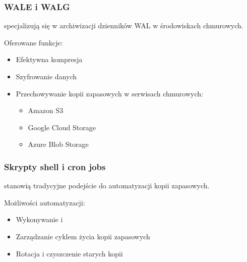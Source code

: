 \documentclass[a4paper,11pt,openany,english]{sphinxmanual}
\begin{document}
\subsubsection{WAL\sphinxhyphen{}E i WAL\sphinxhyphen{}G}
\label{\detokenize{rozdzial2/Kopie_zapasowe_i_odzyskiwanie_danych/kopie_zapasowe_i_odzyskiwanie_danych:wal-e-i-wal-g}}
\sphinxAtStartPar
{} specjalizują się w archiwizacji dzienników WAL w środowiskach chmurowych.

\sphinxAtStartPar
Oferowane funkcje:
\begin{itemize}
\item {} 
\sphinxAtStartPar
Efektywna kompresja

\item {} 
\sphinxAtStartPar
Szyfrowanie danych

\item {} 
\sphinxAtStartPar
Przechowywanie kopii zapasowych w serwisach chmurowych:
\begin{itemize}
\item {} 
\sphinxAtStartPar
Amazon S3

\item {} 
\sphinxAtStartPar
Google Cloud Storage

\item {} 
\sphinxAtStartPar
Azure Blob Storage

\end{itemize}

\end{itemize}


\subsubsection{Skrypty shell i cron jobs}
\label{\detokenize{rozdzial2/Kopie_zapasowe_i_odzyskiwanie_danych/kopie_zapasowe_i_odzyskiwanie_danych:skrypty-shell-i-cron-jobs}}
\sphinxAtStartPar
{} stanowią tradycyjne podejście do automatyzacji kopii zapasowych.

\sphinxAtStartPar
Możliwości automatyzacji:
\begin{itemize}
\item {} 
\sphinxAtStartPar
Wykonywanie  i 

\item {} 
\sphinxAtStartPar
Zarządzanie cyklem życia kopii zapasowych

\item {} 
\sphinxAtStartPar
Rotacja i czyszczenie starych kopii

\end{itemize}
\end{document}
